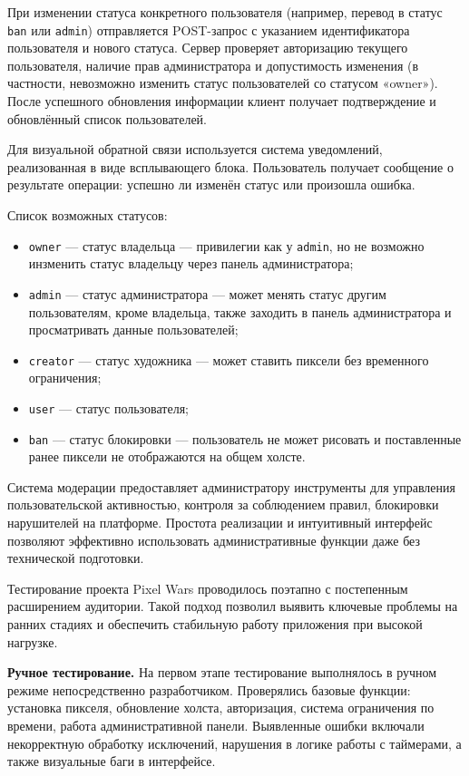При изменении статуса конкретного пользователя (например, перевод в статус \texttt{ban} или \texttt{admin}) отправляется POST-запрос с указанием идентификатора пользователя и нового статуса. Сервер проверяет авторизацию текущего пользователя, наличие прав администратора и допустимость изменения (в частности, невозможно изменить статус пользователей со статусом «owner»). После успешного обновления информации клиент получает подтверждение и обновлённый список пользователей.

Для визуальной обратной связи используется система уведомлений, реализованная в виде всплывающего блока. Пользователь получает сообщение о результате операции: успешно ли изменён статус или произошла ошибка.

Список возможных статусов:
\begin{itemize}
    \item \texttt{owner} --- статус владельца --- привилегии как у \texttt{admin}, но не возможно инзменить статус владельцу через панель администратора;
    \item \texttt{admin} --- статус администратора --- может менять статус другим пользователям, кроме владельца, также заходить в панель администратора и просматривать данные пользователей;
    \item \texttt{creator} --- статус художника --- может ставить пиксели без временного ограничения;
    \item \texttt{user} --- статус пользователя;
    \item \texttt{ban} --- статус блокировки --- пользователь не может рисовать и поставленные ранее пиксели не отображаются на общем холсте.
\end{itemize}

Система модерации предоставляет администратору инструменты для управления пользовательской активностью, контроля за соблюдением правил, блокировки нарушителей на платформе. Простота реализации и интуитивный интерфейс позволяют эффективно использовать административные функции даже без технической подготовки.

\newpage


Тестирование проекта Pixel Wars проводилось поэтапно с постепенным расширением аудитории. Такой подход позволил выявить ключевые проблемы на ранних стадиях и обеспечить стабильную работу приложения при высокой нагрузке.

\textbf{Ручное тестирование.} На первом этапе тестирование выполнялось в ручном режиме непосредственно разработчиком. Проверялись базовые функции: установка пикселя, обновление холста, авторизация, система ограничения по времени, работа административной панели. Выявленные ошибки включали некорректную обработку исключений, нарушения в логике работы с таймерами, а также визуальные баги в интерфейсе.

